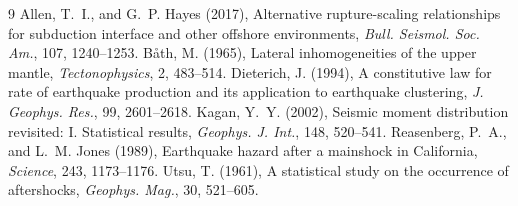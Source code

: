 \documentclass[11pt]{article}
\begin{document}
\begin{thebibliography}{9}\small
{} Allen, T.~I., and G.~P. Hayes (2017), Alternative rupture-scaling
relationships for subduction interface and other offshore environments,
\emph{Bull. Seismol. Soc. Am.}, 107, 1240--1253.
 B\aa th, M. (1965), Lateral inhomogeneities of the upper mantle,
\emph{Tectonophysics}, 2, 483--514.
 Dieterich, J. (1994), A constitutive law for rate of earthquake
production and its application to earthquake clustering,
\emph{J. Geophys. Res.}, 99, 2601--2618.
 Kagan, Y.~Y. (2002), Seismic moment distribution revisited: I.
Statistical results, \emph{Geophys. J. Int.}, 148, 520--541.
 Reasenberg, P.~A., and L.~M. Jones (1989), Earthquake hazard
after a mainshock in California, \emph{Science}, 243, 1173--1176.
 Utsu, T. (1961), A statistical study on the occurrence of
aftershocks, \emph{Geophys. Mag.}, 30, 521--605.
\end{thebibliography}
\end{document}
